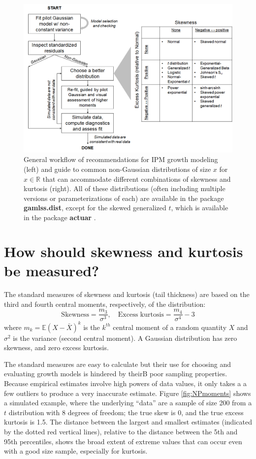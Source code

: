 \documentclass[11pt]{article}
\newcounter{box}
\newcommand{\be}{\begin{equation}}
\newcommand{\ee}{\end{equation}}
\begin{document}
{\begin{figure}
\centering
\includegraphics[width=\textwidth]{figures/workflow}
\caption{General workflow of recommendations for IPM growth modeling (left) and guide to common non-Gaussian distributions of size $x$ for $x \in \mathbb{R}$ that can accommodate different combinations of skewness and kurtosis (right). 
All of these distributions (often including multiple versions or parameterizations of each) are available in the package \textbf{gamlss.dist}, except for the skewed generalized $t$, which is available in the package \textbf{actuar} \citep{dutang2008actuar}.}
\label{fig:workflow}
\end{figure} 

\section{How should skewness and kurtosis be measured?}
The standard measures of skewness and kurtosis (tail thickness) are based on the third and fourth central moments, respectively, of the distribution: 
\be
\mbox{Skewness} = \frac{m_3}{\sigma^3}, \quad \mbox{Excess kurtosis} = \frac{m_4}{\sigma^4}-3
\ee
where $m_k = \mathbb{E}(X - \bar{X})^k$ is the $k^{th}$ central moment of a random quantity $X$ 
and $\sigma^2$ is the variance (second central moment). A Gaussian distribution has zero skewness, 
and zero excess kurtosis. 

The standard measures are easy to calculate but their use for choosing and evaluating growth models is hindered by theirB
poor sampling properties. Because empirical estimates involve high powers of data values, it only takes a 
a few outliers to produce a very inaccurate estimate. Figure \ref{fig:NPmoments} shows a simulated example, where the
underlying ``data'' are a sample of size 200 from a $t$ distribution with 8 degrees of freedom; the true skew is 0, and the 
true excess kurtosis is 1.5. The distance between the largest and smallest estimates (indicated by the dotted red
vertical lines), relative to the distance between the 5th and 95th percentiles, shows the broad extent of 
extreme values that can occur even with a good size sample, especially for kurtosis. 

}
\end{document}

